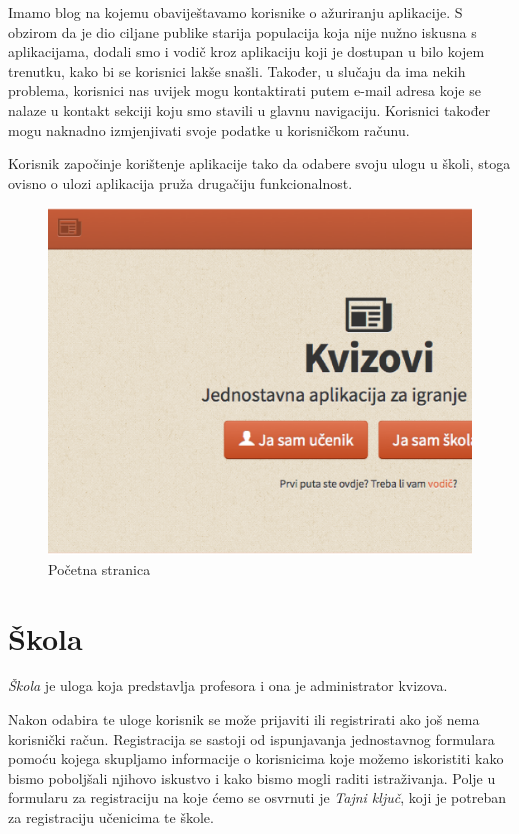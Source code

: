 \documentclass{scrreprt}
\begin{document}
Imamo blog na kojemu obaviještavamo korisnike o ažuriranju aplikacije. S obzirom
da je dio ciljane publike starija populacija koja nije nužno iskusna s
aplikacijama, dodali smo i vodič kroz aplikaciju koji je dostupan u bilo kojem
trenutku, kako bi se korisnici lakše snašli. Također, u slučaju da ima nekih
problema, korisnici nas uvijek mogu kontaktirati putem e-mail adresa koje se
nalaze u kontakt sekciji koju smo stavili u glavnu navigaciju. Korisnici također
mogu naknadno izmjenjivati svoje podatke u korisničkom računu.

Korisnik započinje korištenje aplikacije tako da odabere svoju ulogu u školi,
stoga ovisno o ulozi aplikacija pruža drugačiju funkcionalnost.

\begin{figure}[H]
  \includegraphics[width=\textwidth, clip=true, trim=0 7cm 0 0, fbox]{home}
  \caption{Početna stranica}
\end{figure}

\section{Škola}

\emph{Škola} je uloga koja predstavlja profesora i ona je administrator kvizova.

Nakon odabira te uloge korisnik se može prijaviti ili registrirati ako još nema
korisnički račun. Registracija se sastoji od ispunjavanja jednostavnog formulara
pomoću kojega skupljamo informacije o korisnicima koje možemo iskoristiti kako
bismo poboljšali njihovo iskustvo i kako bismo mogli raditi istraživanja. Polje
u formularu za registraciju na koje ćemo se osvrnuti je \emph{Tajni ključ}, koji
je potreban za registraciju učenicima te škole.
\end{document}
